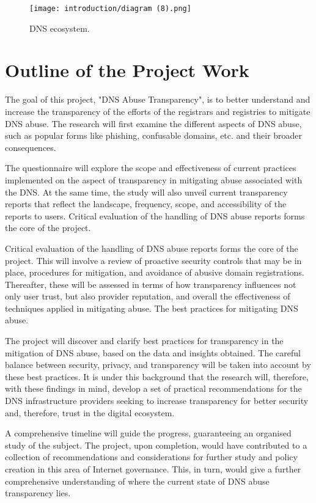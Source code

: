 \begin{figure}[H]
    \centering
    \texttt{[image: introduction/diagram (8).png]}
    \caption{ DNS ecosystem.}
    \label{fig:dnsintrointro}
\end{figure}

\section{ Outline of the Project Work} 

The goal of this project, "DNS Abuse Transparency", is to better understand and increase the transparency of the efforts of the registrars and registries to mitigate DNS abuse. The research will first examine the different aspects of DNS abuse, such as popular forms like phishing, confusable domains, etc. and their broader consequences. 

The questionnaire will explore the scope and effectiveness of current practices implemented on the aspect of transparency in mitigating abuse associated with the DNS. At the same time, the study will also unveil current transparency reports that reflect the landscape, frequency, scope, and accessibility of the reports to users. Critical evaluation of the handling of DNS abuse reports forms the core of the project.

Critical evaluation of the handling of DNS abuse reports forms the core of the project. This will involve a review of proactive security controls that may be in place, procedures for mitigation, and avoidance of abusive domain registrations. Thereafter, these will be assessed in terms of how transparency influences not only user trust, but also provider reputation, and overall the effectiveness of techniques applied in mitigating abuse. The best practices for mitigating DNS abuse.

The project will discover and clarify best practices for transparency in the mitigation of DNS abuse, based on the data and insights obtained. The careful balance between security, privacy, and transparency will be taken into account by these best practices. It is under this background that the research will, therefore, with these findings in mind, develop a set of practical recommendations for the DNS infrastructure providers seeking to increase transparency for better security and, therefore, trust in the digital ecosystem.

A comprehensive timeline will guide the progress, guaranteeing an organised study of the subject. The project, upon completion, would have contributed to a collection of recommendations and considerations for further study and policy creation in this area of Internet governance. This, in turn, would give a further comprehensive understanding of where the current state of DNS abuse transparency lies.

